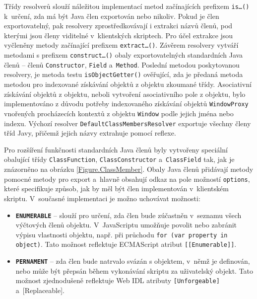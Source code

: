 Třídy resolverů slouží náležitou implementací metod začínajících prefixem \texttt{is\ldots()} k~určení, zda má být Java člen exportován nebo nikoliv. Pokud je člen exportovatelný, pak resolvery zprostředkovávají i extrakci názvů členů, pod kterými jsou členy viditelné v~klientských skriptech. Pro účel extrakce jsou vyčleněny metody začínající prefixem \texttt{extract\ldots()}. Závěrem resolvery vytváří metodami s prefixem \texttt{construct\ldots()} obaly exportovatelných standardních Java členů -- členů \texttt{Constructor}, \texttt{Field} a~\texttt{Method}. Poslední metodou poskytovanou resolvery, je metoda testu \texttt{isObjectGetter()} ověřující, zda je předaná metoda metodou pro indexované získávání objektů z objektu zkoumané třídy. Asociativní získávání objektů z objektu, neboli vytvoření asociativního pole z objektu, bylo implementováno z důvodu potřeby indexovaného získávání objektů \texttt{WindowProxy} vnořených procházecích kontextů z objektu \texttt{Window} podle jejich jména nebo indexu. Výchozí resolver \texttt{DefaultClassMembersResolver} exportuje všechny členy tříd Javy, přičemž jejich názvy extrahuje pomocí reflexe.

Pro rozšíření funkčnosti standardních Java členů byly vytvořeny speciální obalující třídy \texttt{ClassFunction}, \texttt{ClassConstructor} a~\texttt{ClassField} tak, jak je znázorněno na obrázku \ref{Figure.ClassMember}. Obaly Java členů přidávají metody pomocné metody pro export a~hlavně obsahují odkaz na pole možností \texttt{options}, které specifikuje způsob, jak by měl být člen implementován v~klientském skriptu. V~současné implementaci je možno uchovávat možnosti:

\begin{itemize}
  \item \textbf{\texttt{ENUMERABLE}} -- slouží pro určení, zda člen bude zúčastněn v~seznamu všech výčtových členů objektu. V~JavaScriptu umožňuje povolit nebo zabránit výpisu vlastnosti objektu, např. při průchodu \texttt{for (var property in object)}. Tato možnost reflektuje ECMAScript atribut \texttt{[[Enumerable]]}.
  \item \textbf{\texttt{PERNAMENT}} -- zda člen bude natrvalo svázán s objektem, v~němž je definován, nebo může být přepsán během vykonávání skriptu za uživatelský objekt. Tato možnost zjednodušeně reflektuje Web IDL atributy \texttt{[Unforgeable]} a~[Replaceable].
\end{itemize}

